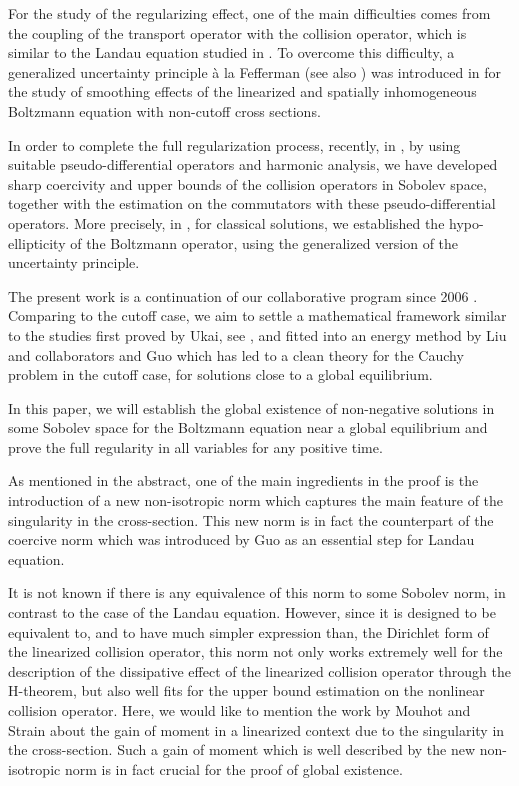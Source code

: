 \documentclass{amsart}[12pt, article]
\begin{document}
For the study of the regularizing effect,
one of the main difficulties  comes {}from
the coupling of the
transport operator with the collision operator,
which is similar to the Landau equation studied in \cite{desv-landau}. To overcome this difficulty, a
generalized uncertainty principle \`a la Fefferman
\cite{Fefferman} (see also \cite{morimo873, morimo921,
morimoto-mori}) was introduced in \cite{amuxy-nonlinear,amuxy-nonlinear-b} for the study
of smoothing effects of the linearized and spatially inhomogeneous
Boltzmann equation  with non-cutoff cross sections.

In order to complete the full regularization process, recently, in \cite{amuxy-nonlinear-3}, by using suitable pseudo-differential operators and harmonic analysis, we have developed sharp coercivity and upper bounds of the collision
operators in Sobolev space, together with the estimation on the commutators
with these pseudo-differential operators.
 More precisely, in \cite{amuxy2,amuxy2b,amuxy-nonlinear-3},
for classical solutions, we established the hypo-ellipticity of the
Boltzmann operator, using the generalized version of the uncertainty
principle.

The present work is a continuation of our collaborative program since 2006 
\cite{amuxy-nonlinear-b,amuxy2, amuxy2b, amuxy-nonlinear-3}. Comparing to the cutoff case, we aim to settle a mathematical framework similar to the studies first proved by Ukai, see \cite{ukai-1a, ukai-1b}, and fitted into an energy method by Liu and collaborators \cite{liu-1,liu-2}
and Guo \cite{guo-1} which has led to a clean theory for the Cauchy problem in the cutoff case, for solutions close to a global equilibrium.

In this paper, we will
establish the global existence of  non-negative solutions in some Sobolev space
for the Boltzmann equation near a global equilibrium
and prove the full
regularity  in all variables for any positive time.

As mentioned
in the abstract, one of the main ingredients in the proof is the
introduction of a new non-isotropic norm which captures the main feature
of the singularity in the cross-section. This new norm is in fact the counterpart of the coercive norm which was introduced by Guo \cite{guo} as an essential step for Landau equation. 

It is not known if there is any equivalence of this norm to some Sobolev norm, in contrast 
to  the case of the Landau equation. 
However, since it is designed to be 
equivalent to, and to have much simpler expression than,  
 the Dirichlet form of the linearized collision operator, 
this norm not only works
extremely well for the description of the dissipative effect of the linearized
collision operator through the H-theorem, but also well fits for the
upper bound estimation on the nonlinear collision operator. Here,
we would like to mention the work by Mouhot and Strain \cite{mouhot,mouhot-strain} about the gain of moment
in a linearized context due to the singularity in the cross-section. Such
a gain of moment which is well described by the new non-isotropic norm
is in fact  crucial for the proof of global
existence.
\end{document}
